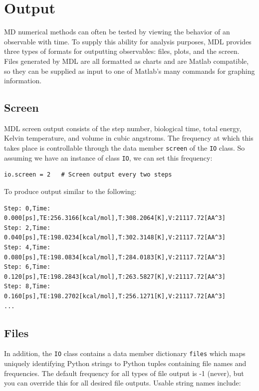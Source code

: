 \documentclass[11pt]{report}
\begin{document}
\section{Output}

MD numerical methods can often be tested by viewing the behavior
of an observable with time.  To supply this ability for analysis
purposes, MDL provides three types of formats for outputting
observables: files, plots, and the screen.  Files generated by
MDL are all formatted as charts and are Matlab compatible, so
they can be supplied as input to one of Matlab's many commands for
graphing information.

\subsection{Screen}

MDL screen output consists of the step number, biological time,
total energy, Kelvin temperature, and volume in cubic angstroms.
The frequency at which this takes place is controllable through
the data member \texttt{screen} of the \texttt{IO} class.
So assuming we have an instance of class \texttt{IO}, we can
set this frequency:

\begin{verbatim}
io.screen = 2   # Screen output every two steps
\end{verbatim}

To produce output similar to the following:

\begin{verbatim}
Step: 0,Time: 0.000[ps],TE:256.3166[kcal/mol],T:308.2064[K],V:21117.72[AA^3]
Step: 2,Time: 0.040[ps],TE:198.0234[kcal/mol],T:302.3148[K],V:21117.72[AA^3]
Step: 4,Time: 0.080[ps],TE:198.0834[kcal/mol],T:284.0183[K],V:21117.72[AA^3]
Step: 6,Time: 0.120[ps],TE:198.2843[kcal/mol],T:263.5827[K],V:21117.72[AA^3]
Step: 8,Time: 0.160[ps],TE:198.2702[kcal/mol],T:256.1271[K],V:21117.72[AA^3]
...
\end{verbatim}


\subsection{Files}

In addition, the \texttt{IO} class contains a data member dictionary
\texttt{files} which maps uniquely identifying Python strings to 
Python tuples containing file names and frequencies.  The default
frequency for all types of file output is -1 (never), but you can
override this for all desired file outputs.  Usable string names
include: \\
\end{document}
